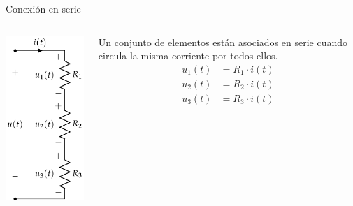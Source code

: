 \documentclass[xcolor={usenames,svgnames,dvipsnames}]{beamer}
\begin{document}
\begin{frame}[label={sec:orgaf905aa}]{Conexión en serie}
\begin{columns}
\begin{column}{0.3\columnwidth}
\begin{center}
\includegraphics[width=.9\linewidth]{figs/AsociacionSerie.pdf}
\end{center}
\end{column}
\begin{column}{0.7\columnwidth}
Un conjunto de elementos están asociados en serie cuando circula la misma corriente por todos ellos.
\begin{align*}
  u_1(t) &= R_1 \cdot i(t)\\
  u_2(t) &= R_2 \cdot i(t)\\
  u_3(t) &= R_3 \cdot i(t)
\end{align*}
\end{column}
\end{columns}
\end{frame}
\end{document}
